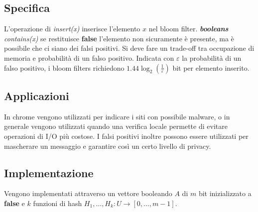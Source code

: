 \subsection{Specifica}
L'operazione di \emph{insert(x)} inserisce l'elemento $x$ nel bloom filter. \emph{\textbf{booleans} contains(x)} se restituisce \textbf{false} l'elemento 
non sicuramente \`e presente, ma \`e possibile che ci siano dei falsi positivi. Si deve fare un trade-off tra occupazione di memoria e probabilit\`a di un
falso positivo. Indicata con $\varepsilon$ la probabilit\`a di un falso positivo, i bloom filters richiedono $1.44\log_2(\frac{1}{\varepsilon})$ bit per 
elemento inserito. 
\subsection{Applicazioni}
In chrome vengono utilizzati per indicare i siti con possibile malware, o in generale vengono utilizzati quando una verifica locale permette di evitare 
operazioni di I/O pi\`u costose. I falsi positivi inoltre possono essere utilizzati per mascherare un messaggio e garantire cos\`i un certo livello di 
privacy.
\newpage
\subsection{Implementazione}
Vengono implementati attraverso un vettore booleando $A$ di $m$ bit inizializzato a \textbf{false} e $k$ funzioni di hash $H_1,\dots, H_k:U\rightarrow [0, 
\dots, m-1]$. 
\begin{multicols}{2}
\begin{algorithm}[H]
\DontPrintSemicolon
{}
\caption{\protect{}}
\end{algorithm}
\columnbreak
\begin{algorithm}[H]
\DontPrintSemicolon
{}
\caption{\protect\Boolean \protect{}}
\Return \True\;
\end{algorithm}
\end{multicols}
